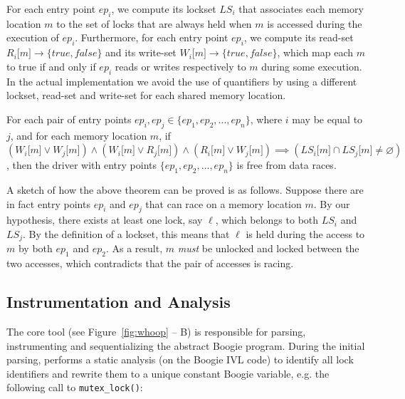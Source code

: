 For each entry point $\mathit{ep}_{i}$, we compute its lockset $\mathit{LS}_{i}$ that associates each memory location $m$ to the set of locks that are always held when $m$ is accessed during the execution of $\mathit{ep}_{i}$. Furthermore, for each entry point $\mathit{ep}_{i}$, we compute its read-set $R_{i}\lbrack m\rbrack \rightarrow \{true, false\}$ and its write-set $W_{i}\lbrack m\rbrack \rightarrow \{true, false\}$, which map each $m$ to true if and only if $\mathit{ep}_{i}$ reads or writes respectively to $m$ during some execution. In the actual implementation we avoid the use of quantifiers by using a different lockset, read-set and write-set for each shared memory location.

\begin{theorem}
\label{theorem:locksets}
For each pair of entry points $\mathit{ep}_{i}, \mathit{ep}_{j}\in \{\mathit{ep}_{1}, \mathit{ep}_{2}, ..., \mathit{ep}_{n}\}$, where $i$ may be equal to $j$, and for each memory location $m$, if $(W_{i}\lbrack m\rbrack \vee W_{j}\lbrack m\rbrack) \wedge (W_{i}\lbrack m\rbrack \vee R_{j}\lbrack m\rbrack) \wedge (R_{i}\lbrack m\rbrack \vee W_{j}\lbrack m\rbrack) \implies (\mathit{LS}_{i}\lbrack m\rbrack \cap \mathit{LS}_{j}\lbrack m\rbrack \not= \varnothing)$, then the driver with entry points $\{\mathit{ep}_{1}, \mathit{ep}_{2}, \dotsc, \mathit{ep}_{n}\}$ is free from data races.
\end{theorem}

A sketch of how the above theorem can be proved is as follows. Suppose there are in fact entry points $\mathit{ep}_{i}$ and $\mathit{ep}_{j}$ that can race on a memory location $m$. By our hypothesis, there exists at least one lock, say $\ell$, which belongs to both $\mathit{LS}_{i}$ and $\mathit{LS}_{j}$. By the definition of a lockset, this means that $\ell$ is held during the access to $m$ by both $ep_1$ and $ep_2$. As a result, $m$ \emph{must} be unlocked and locked between the two accesses, which contradicts that the pair of accesses is racing.

\subsection{Instrumentation and Analysis}
\label{whoop:method}

The core \whoop tool (see Figure~\ref{fig:whoop} -- B) is responsible for parsing, instrumenting and sequentializing the abstract Boogie program. During the initial parsing, \whoop performs a static analysis (on the Boogie IVL code) to identify all lock identifiers and rewrite them to a unique constant Boogie variable, e.g. the following call to \texttt{mutex\_lock()}:

